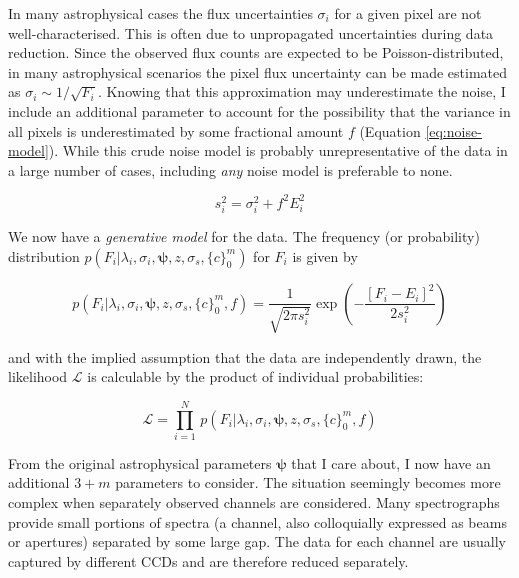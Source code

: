 \documentclass{aastex}
\begin{document}
In many astrophysical cases the flux uncertainties $\sigma_{i}$ for a given pixel 
are not well-characterised. This is often due to unpropagated uncertainties during 
data reduction. Since the observed flux counts are expected to be Poisson-distributed, 
in many astrophysical scenarios the pixel flux uncertainty can be made estimated 
as $\sigma_i \sim 1/\sqrt{F_{i}}$. Knowing that this approximation may underestimate 
the noise, I include an additional parameter to account for the possibility that 
the variance in all pixels is underestimated by some fractional amount $f$ 
(Equation \ref{eq:noise-model}). While this crude noise model is probably 
unrepresentative of the data in a large number of cases, including \textit{any} 
noise model is preferable to none.

\begin{equation}
s_{i}^2 = \sigma_{i}^2 + f^{2}E_{i}^2
\label{eq:noise-model}
\end{equation}

We now have a \textit{generative model} for the data. The frequency (or 
probability) distribution ${p\left(F_i|\lambda_i,\sigma_i,\bm{\psi},z,\sigma_s,\{c\}_{0}^{m}\right)}$ 
for $F_i$ is given by

\begin{equation}
p\left(F_i|\lambda_i,\sigma_{i},\bm{\psi},z,\sigma_{s},\{c\}_{0}^{m},f\right) = 
 \frac{1}{\sqrt{2\pi{}s_{i}^2}}\exp{\left(-\frac{\left[F_i - E_i\right]^2}{2s_{i}^2}\right)}
 \label{eq:p_model}
\end{equation}

\noindent{}and with the implied assumption that the data are independently drawn,
the likelihood $\mathcal{L}$ is calculable by the product of individual probabilities:

\begin{equation}
\mathcal{L} = \prod_{i=1}^{N}\,p\left(F_i|\lambda_i,\sigma_{i},\bm{\psi},z,\sigma_{s},\{c\}_{0}^{m},f\right)
\end{equation}

From the original astrophysical parameters $\bm{\psi}$ that I care about, I now 
have an additional $3 + m$ parameters to consider. The situation seemingly becomes 
more complex when separately observed channels are considered. Many spectrographs 
provide small portions of spectra (a channel, also colloquially expressed as beams 
or apertures) separated by some large gap. The data for each channel are usually 
captured by different CCDs and are therefore reduced separately. 
\end{document}
